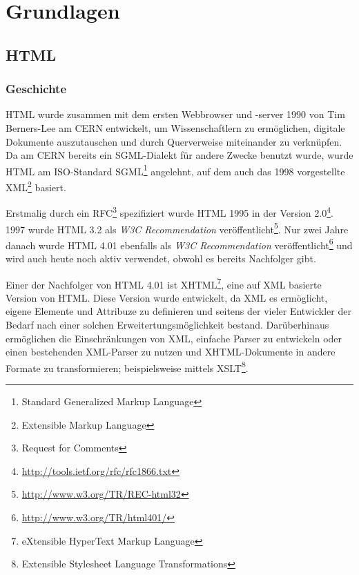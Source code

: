 \chapter{Grundlagen}

\section{HTML}

\subsection{Geschichte}
HTML wurde zusammen mit dem ersten Webbrowser und -server 1990 von Tim Berners-Lee am CERN
entwickelt, um Wissenschaftlern zu ermöglichen, digitale Dokumente auszutauschen und durch
Querverweise miteinander zu verknüpfen. Da am CERN bereits ein SGML-Dialekt für andere Zwecke
benutzt wurde, wurde HTML am ISO-Standard SGML\footnote{Standard Generalized Markup Language}
angelehnt, auf dem auch das 1998 vorgestellte XML\footnote{Extensible Markup Language} basiert.

Erstmalig durch ein RFC\footnote{Request for Comments} spezifiziert wurde HTML 1995 in der Version
2.0\footnote{\href{http://tools.ietf.org/rfc/rfc1866.txt}{http://tools.ietf.org/rfc/rfc1866.txt}}.
1997 wurde HTML 3.2 als \emph{W3C Recommendation}
veröffentlicht\footnote{\href{http://www.w3.org/TR/REC-html32}{http://www.w3.org/TR/REC-html32}}.
Nur zwei Jahre danach wurde HTML 4.01 ebenfalls als \emph{W3C Recommendation}
veröffentlicht\footnote{\href{http://www.w3.org/TR/html401/}{http://www.w3.org/TR/html401/}} und
wird auch heute noch aktiv verwendet, obwohl es bereits Nachfolger gibt.

Einer der Nachfolger von HTML 4.01 ist XHTML\footnote{eXtensible HyperText Markup Language}, eine
auf XML basierte Version von HTML. Diese Version wurde entwickelt, da XML es ermöglicht, eigene
Elemente und Attribuze zu definieren und seitens der vieler Entwickler der Bedarf nach einer solchen
Erweitertungsmöglichkeit bestand. Darüberhinaus ermöglichen die Einschränkungen von XML, einfache
Parser zu entwickeln oder einen bestehenden XML-Parser zu nutzen und XHTML-Dokumente in andere
Formate zu transformieren; beispielsweise mittels XSLT\footnote{Extensible Stylesheet Language
Transformations}. \citep{w3c:xhtml}

